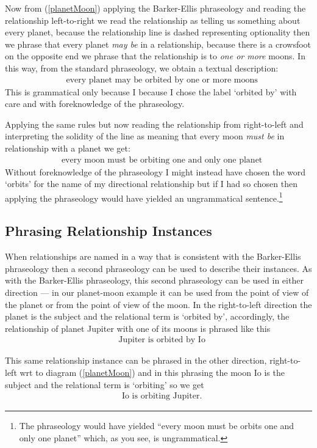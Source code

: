 Now from (\ref{planetMoon}) applying the Barker-Ellis  phraseology and reading the 
relationship left-to-right we read the relationship as telling us something about every planet, because the relationship line is dashed representing optionality then we phrase that every planet \textit{may be} 
in a relationship,
because there is a crowsfoot on the opposite end we phrase that the relationship is to 
\textit{one or more} moons.  In this way, from the standard phraseology, we obtain a textual description:
\begin{align}
&\mbox{every planet may be orbited by one or more moons} 
\end{align}
This is grammatical only because I 
because I chose the label `orbited by' with care and with foreknowledge of the  phraseology.
 
Applying the same rules but now reading  the relationship from right-to-left and interpreting the solidity of the line as 
 meaning that every moon \textit{must be} in relationship with a planet we get:
\begin{align}
&\mbox{every moon must be orbiting  one and only one planet} 
\end{align}
Without foreknowledge of the phraseology I might instead have chosen the word `orbits' for the name of my directional relationship but if I had so chosen then applying the phraseology would have yielded an ungrammatical sentence.\footnote{The phraseology would have yielded ``every moon must be orbits one and only one planet'' which, as you see, is ungrammatical.}
\subsection{Phrasing Relationship Instances}
\mynote
When relationships are named in a way that is consistent with the Barker-Ellis phraseology   
then a second phraseology can be used to describe their instances. 
As with the Barker-Ellis phraseology, this second phraseology
 can be used in either direction
 --- in our planet-moon example it can be used from the point of view
of the planet or from the point of view of the moon.
In the right-to-left direction the planet is the subject and the relational term is
`orbited by', accordingly, the relationship of planet Jupiter with one of its moons is phrased like this
\begin{align}
&\mbox{Jupiter is orbited by Io}
\end{align}

This same relationship instance can be phrased in the other direction, right-to-left wrt to diagram (\ref{planetMoon}) and in this phrasing the moon Io is the subject and the relational term is `orbiting' so we get
\begin{align}
&\mbox{Io is orbiting  Jupiter.}
\end{align}

